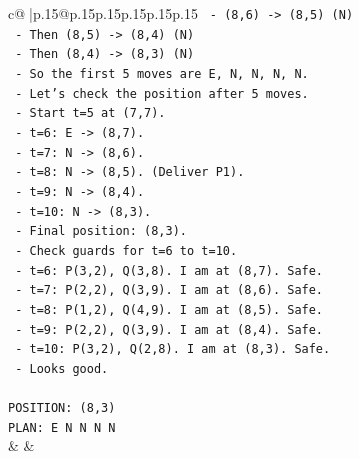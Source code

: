 \documentclass{article}
\begin{document}
{\begin{supertabular}{c@{$\;$}|p{.15\linewidth}@{}p{.15\linewidth}p{.15\linewidth}p{.15\linewidth}p{.15\linewidth}p{.15\linewidth}}
{{{\texttt{    {-} (8,6) {-}> (8,5) (N)} \\
\texttt{    {-} Then (8,5) {-}> (8,4) (N)} \\
\texttt{    {-} Then (8,4) {-}> (8,3) (N)} \\
\texttt{  {-} So the first 5 moves are E, N, N, N, N.} \\
\texttt{  {-} Let's check the position after 5 moves.} \\
\texttt{    {-} Start t=5 at (7,7).} \\
\texttt{    {-} t=6: E {-}> (8,7).} \\
\texttt{    {-} t=7: N {-}> (8,6).} \\
\texttt{    {-} t=8: N {-}> (8,5). (Deliver P1).} \\
\texttt{    {-} t=9: N {-}> (8,4).} \\
\texttt{    {-} t=10: N {-}> (8,3).} \\
\texttt{  {-} Final position: (8,3).} \\
\texttt{  {-} Check guards for t=6 to t=10.} \\
\texttt{    {-} t=6: P(3,2), Q(3,8). I am at (8,7). Safe.} \\
\texttt{    {-} t=7: P(2,2), Q(3,9). I am at (8,6). Safe.} \\
\texttt{    {-} t=8: P(1,2), Q(4,9). I am at (8,5). Safe.} \\
\texttt{    {-} t=9: P(2,2), Q(3,9). I am at (8,4). Safe.} \\
\texttt{    {-} t=10: P(3,2), Q(2,8). I am at (8,3). Safe.} \\
\texttt{  {-} Looks good.} \\
\\ 
\texttt{POSITION: (8,3)} \\
\texttt{PLAN: E N N N N} \\
            }
        }
    }
    & & \\ \\


\end{supertabular}}
\end{document}
